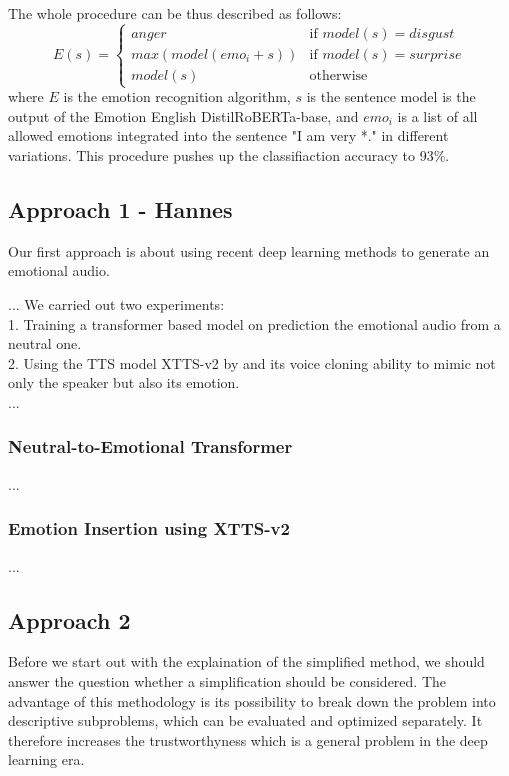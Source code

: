 \documentclass[11pt]{article}
\begin{document}
The whole procedure can be thus described as follows:
{
\small
\begin{equation*}
E(s)=\begin{cases}
  anger & \text{if } model(s)=disgust\\      
  max(model(emo_i+s)) & \text{if }  model(s)=surprise\\
  model(s) & \text{otherwise } 
\end{cases}
\end{equation*}
}
where $E$ is the emotion recognition algorithm, $s$ is the sentence model is the output of the Emotion English DistilRoBERTa-base, and $emo_i$ is a list of all allowed emotions integrated into the sentence "I am very *." in different variations.
This procedure pushes up the classifiaction accuracy to 93\%.

\subsection{Approach 1 - Hannes}
Our first approach is about using recent deep learning methods to generate an emotional audio. 
 
...
We carried out two experiments: \\
1. Training a transformer based model on prediction the emotional audio from a neutral one. \\
2. Using the TTS model XTTS-v2 by \cite{casanova2024xtts} and its voice cloning ability to mimic not only the speaker but also its emotion.\\
...
\subsubsection{Neutral-to-Emotional Transformer}
...
\subsubsection{Emotion Insertion using XTTS-v2}
...

\subsection{Approach 2}

Before we start out with the explaination of the simplified method, we should answer the question whether a simplification should be considered. The advantage of this methodology is its possibility to break down the problem into descriptive subproblems, which can be evaluated and optimized separately. It therefore increases the trustworthyness which is a general problem in the deep learning era.
\end{document}
